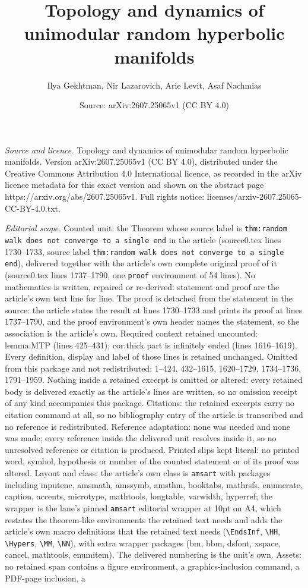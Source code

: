 \documentclass[10pt,a4paper]{amsart}
\title[Topology and dynamics of unimodular random hyperbolic manifo]{Topology and dynamics of unimodular random hyperbolic manifolds}
\author{Ilya Gekhtman, Nir Lazarovich, Arie Levit, Asaf Nachmias}
\date{Source: arXiv:2607.25065v1 (CC BY 4.0)}
\begin{document}
\maketitle

\noindent\emph{Source and licence.} Topology and dynamics of unimodular random hyperbolic manifolds. Version arXiv:2607.25065v1 (CC BY 4.0), distributed under the Creative Commons Attribution 4.0 International licence, as recorded in the arXiv licence metadata for this exact version and shown on the abstract page https://arxiv.org/abs/2607.25065v1. Full rights notice: licenses/arxiv-2607.25065-CC-BY-4.0.txt.\par\smallskip

\noindent\textit{Editorial scope.} Counted unit: the Theorem whose source label is \texttt{thm:random walk does not converge to a single end} in the article (source0.tex lines 1730--1733, source label \texttt{thm:random walk does not converge to a single end}), delivered together with the article's own complete original proof of it (source0.tex lines 1737--1790, one \texttt{proof} environment of 54 lines). No mathematics is written, repaired or re-derived: statement and proof are the article's own text line for line. The proof is detached from the statement in the source: the article states the result at lines 1730--1733 and prints its proof at lines 1737--1790, and the proof environment's own header names the statement, so the association is the article's own. Required context retained uncounted: lemma:MTP (lines 425--431); cor:thick part is infinitely ended (lines 1616--1619). Every definition, display and label of those lines is retained unchanged. Omitted from this package and not redistributed: 1--424, 432--1615, 1620--1729, 1734--1736, 1791--1959. Nothing inside a retained excerpt is omitted or altered: every retained body is delivered exactly as the article's lines are written, so no omission receipt of any kind accompanies this package. Citations: the retained excerpts carry no citation command at all, so no bibliography entry of the article is transcribed and no reference is redistributed. Reference adaptation: none was needed and none was made; every reference inside the delivered unit resolves inside it, so no unresolved reference or citation is produced. Printed slips kept literal: no printed word, symbol, hypothesis or number of the counted statement or of its proof was altered. Layout and class: the article's own class is \texttt{amsart} with packages including inputenc, amsmath, amssymb, amsthm, booktabs, mathrsfs, enumerate, caption, accents, microtype, mathtools, longtable, varwidth, hyperref; the wrapper is the lane's pinned \texttt{amsart} editorial wrapper at 10pt on A4, which restates the theorem-like environments the retained text needs and adds the article's own macro definitions that the retained text needs (\texttt{\textbackslash EndsInf}, \texttt{\textbackslash HH}, \texttt{\textbackslash Hypers}, \texttt{\textbackslash MM}, \texttt{\textbackslash NN}), with extra wrapper packages (bm, bbm, dsfont, xspace, cancel, mathtools, enumitem). The delivered numbering is the unit's own. Assets: no retained span contains a figure environment, a graphics-inclusion command, a PDF-page inclusion, a 
\end{document}
